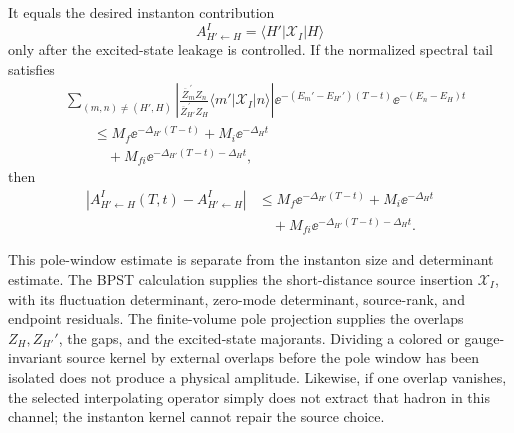 \begin{controlledapproximation}
\begin{equation}
\end{equation}
It equals the desired instanton contribution
\[
  A_{H'\leftarrow H}^{I}
  =
  \langle H'|\mathcal X_I|H\rangle
\]
only after the excited-state leakage is controlled.  If the normalized
spectral tail satisfies
\begin{equation}
  \begin{aligned}
  &\sum_{(m,n)\ne(H',H)}
  \left|
  \frac{\overline Z_m^{\,\prime}Z_n}
       {\overline Z_{H'}^{\,\prime}Z_H}
  \langle m'|\mathcal X_I|n\rangle
  \right|
  \ee^{-(E_m'-E_{H'}')(T-t)}
  \ee^{-(E_n-E_H)t}
  \\
  &\qquad\le
  M_f \ee^{-\Delta_{H'}(T-t)}
  +M_i \ee^{-\Delta_Ht}
  \\
  &\qquad\quad
  +M_{fi}\ee^{-\Delta_{H'}(T-t)-\Delta_Ht},
  \end{aligned}
  \label{eq:instanton-hadronic-pole-window-tail-bound}
\end{equation}
then
\begin{equation}
  \begin{aligned}
  \left|
  A_{H'\leftarrow H}^{I}(T,t)
  -
  A_{H'\leftarrow H}^{I}
  \right|
  &\le
  M_f \ee^{-\Delta_{H'}(T-t)}
  +M_i \ee^{-\Delta_Ht}
  \\
  &\quad
  +M_{fi}\ee^{-\Delta_{H'}(T-t)-\Delta_Ht}.
  \end{aligned}
  \label{eq:instanton-hadronic-pole-window-error}
\end{equation}

This pole-window estimate is separate from the instanton size and determinant
estimate.  The BPST calculation supplies the short-distance source insertion
\(\mathcal X_I\), with its fluctuation determinant, zero-mode determinant,
source-rank, and endpoint residuals.  The finite-volume pole projection
supplies the overlaps \(Z_H,Z_{H'}'\), the gaps, and the excited-state
majorants.  Dividing a colored or gauge-invariant source kernel by external
overlaps before the pole window has been isolated does not produce a physical
amplitude.  Likewise, if one overlap vanishes, the selected interpolating
operator simply does not extract that hadron in this channel; the instanton
kernel cannot repair the source choice.
\end{controlledapproximation}

